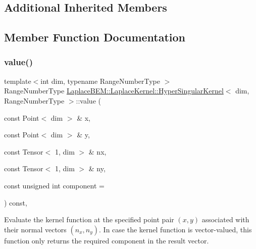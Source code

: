 \subsection*{Additional Inherited Members}


\subsection{Member Function Documentation}
\mbox{\label{classLaplaceBEM_1_1LaplaceKernel_1_1HyperSingularKernel_a02811fc623d2bb605c5eeb22712bdfd6}} 
\subsubsection{\texorpdfstring{value()}{value()}}
{\footnotesize\ttfamily template$<$int dim, typename Range\+Number\+Type $>$ \\
Range\+Number\+Type \hyperlink{classLaplaceBEM_1_1LaplaceKernel_1_1HyperSingularKernel}{Laplace\+B\+E\+M\+::\+Laplace\+Kernel\+::\+Hyper\+Singular\+Kernel}$<$ dim, Range\+Number\+Type $>$\+::value (\begin{DoxyParamCaption}\item[{const Point$<$ dim $>$ \&}]{x,  }\item[{const Point$<$ dim $>$ \&}]{y,  }\item[{const Tensor$<$ 1, dim $>$ \&}]{nx,  }\item[{const Tensor$<$ 1, dim $>$ \&}]{ny,  }\item[{const unsigned int}]{component = {} }\end{DoxyParamCaption}) const\hspace{0.3cm}{\ttfamily [override]}, {\ttfamily [virtual]}}

Evaluate the kernel function at the specified point pair $(x, y)$ associated with their normal vectors $(n_x, n_y)$. In case the kernel function is vector-\/valued, this function only returns the required {\ttfamily component} in the result vector.


